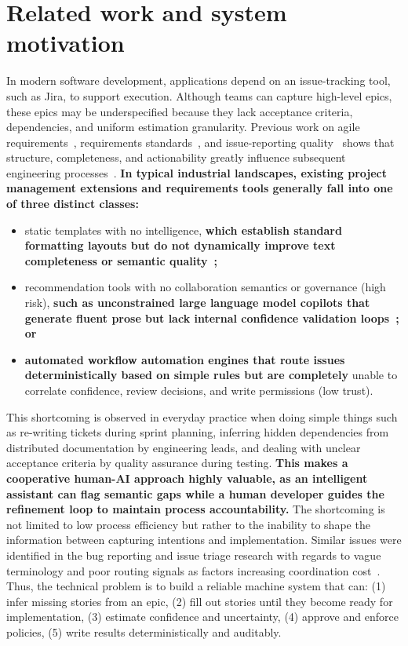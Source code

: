 \documentclass[pdflatex,sn-basic]{sn-jnl}
\begin{document}
\section{Related work and system motivation}
In modern software development, applications depend on an issue-tracking tool, such as Jira, to support execution. Although teams can capture high-level epics, these epics may be underspecified because they lack acceptance criteria, dependencies, and uniform estimation granularity. Previous work on agile requirements~\citep{R63,R64}, requirements standards~\citep{R62}, and issue-reporting quality~\citep{R53} shows that structure, completeness, and actionability greatly influence subsequent engineering processes~\citep{R52}. \textbf{In typical industrial landscapes, existing project management extensions and requirements tools generally fall into one of three distinct classes:}
\begin{itemize}
    \item static templates with no intelligence, \textbf{which establish standard formatting layouts but do not dynamically improve text completeness or semantic quality~\citep{R63,R62};}
    \item recommendation tools with no collaboration semantics or governance (high risk), \textbf{such as unconstrained large language model copilots that generate fluent prose but lack internal confidence validation loops~\citep{R60,R59}; or}
    \item \textbf{automated workflow automation engines that route issues deterministically based on simple rules but are completely} unable to correlate confidence, review decisions, and write permissions (low trust).
\end{itemize}

This shortcoming is observed in everyday practice when doing simple things such as re-writing tickets during sprint planning, inferring hidden dependencies from distributed documentation by engineering leads, and dealing with unclear acceptance criteria by quality assurance during testing. \textbf{This makes a cooperative human-AI approach highly valuable, as an intelligent assistant can flag semantic gaps while a human developer guides the refinement loop to maintain process accountability.} The shortcoming is not limited to low process efficiency but rather to the inability to shape the information between capturing intentions and implementation. Similar issues were identified in the bug reporting and issue triage research with regards to vague terminology and poor routing signals as factors increasing coordination cost~\citep{R67,R68,R66}. Thus, the technical problem is to build a reliable machine system that can:
(1) infer missing stories from an epic,
(2) fill out stories until they become ready for implementation,
(3) estimate confidence and uncertainty,
(4) approve and enforce policies,
(5) write results deterministically and auditably.
\end{document}
